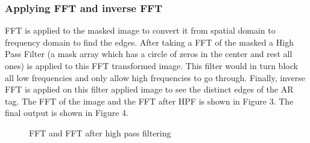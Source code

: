 \documentclass[conference]{IEEEtran}
\begin{document}
\subsubsection{Applying FFT and inverse FFT}
FFT is applied to the masked image to convert it from spatial domain to frequency domain to find the edges. After taking a FFT of the masked a High Pass Filter (a mask array which has a circle of zeros in the center and rest all ones) is applied to this FFT transformed image. This filter would in turn block all low frequencies and only allow high frequencies to go through. Finally, inverse FFT is applied on this filter applied image to see the distinct edges of the AR tag. The FFT of the image and the FFT after HPF is shown in Figure 3. The final output is shown in Figure 4.
\begin{figure}[H]
  \centering
  \hspace{.15cm}%
  \caption{FFT and FFT after high pass filtering}
\end{figure}
\end{document}
